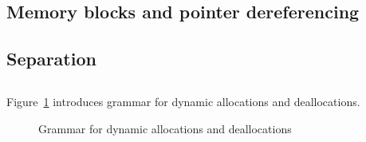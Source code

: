 
\subsection{Memory blocks and pointer dereferencing}
\label{subsec:memory}
\label{sec:memory} %
\nodiff



\subsection{Separation}\label{sec:separation}
\nodiff



\subsection{}
\label{sec:alloc-dealloc}
\nodiff


Figure~\ref{fig:gram:allocation} introduces grammar for dynamic allocations and
deallocations.

\begin{figure}[htp]
  \begin{cadre}
      
    \end{cadre}
  \caption{Grammar for dynamic allocations and deallocations}
\label{fig:gram:allocation}
\end{figure}


\section{}

